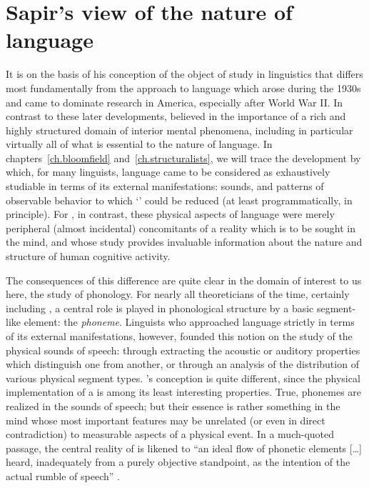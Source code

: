 \section{Sapir's view of the nature of language}

It is on the basis of his conception of the object of study in
linguistics that {\Sapir} differs most fundamentally from the approach to
language which arose during the 1930s and came to dominate research in
America, especially after World War II. In {contrast} to these later
developments, {\Sapir} believed in the importance of a rich and highly
structured domain of interior mental phenomena, including in
particular virtually all of what is essential to the nature of
language. In chapters~\ref{ch.bloomfield} and~\ref{ch.structuralists},
we will trace the development by which, for many linguists, language
came to be considered as exhaustively studiable in terms of its
external manifestations: sounds, and patterns of observable behavior
to which `' could be reduced (at least programmatically, in
principle). For {\Sapir}, in {contrast}, these physical aspects of language
were merely peripheral (almost incidental) concomitants of a reality
which is to be sought in the mind, and whose study provides invaluable
information about the nature and structure of human cognitive
activity.

The consequences of this difference are quite clear in the domain of
interest to us here, the study of phonology. For nearly all
theoreticians of the time, certainly including {\Sapir}, a central role
is played in phonological structure by a basic segment-like element:
the \emph{phoneme}. Linguists who approached language strictly in
terms of its external manifestations, however, founded this notion on
the study of the physical sounds of speech: through extracting the
acoustic or auditory properties which distinguish one 
from another, or through an analysis of the distribution of various
physical segment types. {\Sapir}'s conception is quite different, since
the physical implementation of a  is among its least
interesting properties. True, phonemes are realized in the sounds of
speech; but their essence is rather something in the mind whose most
important features may be unrelated (or even in direct contradiction)
to measurable aspects of a physical event. In a much-quoted passage,
the central reality of  is likened to ``an ideal flow of
phonetic elements [\ldots] heard, inadequately from a purely objective
standpoint, as the intention of the actual rumble of speech''
\citep[56]{sapir21:language}.


